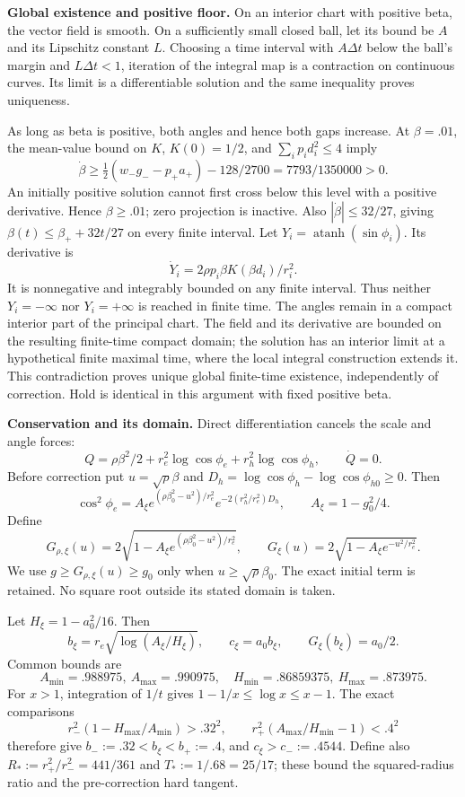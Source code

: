 \documentclass[11pt,a4paper]{article}
\begin{document}
\textbf{Global existence and positive floor.} On an interior chart with positive beta, the vector field is smooth. On a sufficiently small closed ball, let its bound be $A$ and its Lipschitz constant $L$. Choosing a time interval with $A\Delta t$ below the ball's margin and $L\Delta t<1$, iteration of the integral map is a contraction on continuous curves. Its limit is a differentiable solution and the same inequality proves uniqueness.

As long as beta is positive, both angles and hence both gaps increase. At $\beta=.01$, the mean-value bound on $K$, $K(0)=1/2$, and $\sum_i p_i d_i^2\le4$ imply
\[
 \dot\beta\ge\tfrac12(w_-g_--p_+a_+)-128/2700
       =7793/1350000>0 .
\]
An initially positive solution cannot first cross below this level with a positive derivative. Hence $\beta\ge.01$; zero projection is inactive. Also $|\dot\beta|\le32/27$, giving $\beta(t)\le\beta_++32t/27$ on every finite interval. Let $Y_i=\operatorname{atanh}(\sin\phi_i)$. Its derivative is
\[
 \dot Y_i=2\rho p_i\beta K(\beta d_i)/r_i^2 .
\]
It is nonnegative and integrably bounded on any finite interval. Thus neither $Y_i=-\infty$ nor $Y_i=+\infty$ is reached in finite time. The angles remain in a compact interior part of the principal chart. The field and its derivative are bounded on the resulting finite-time compact domain; the solution has an interior limit at a hypothetical finite maximal time, where the local integral construction extends it. This contradiction proves unique global finite-time existence, independently of correction. Hold is identical in this argument with fixed positive beta.

\textbf{Conservation and its domain.} Direct differentiation cancels the scale and angle forces:
\[
 Q=\rho\beta^2/2+r_e^2\log\cos\phi_e+r_h^2\log\cos\phi_h,\qquad \dot Q=0 .
\]
Before correction put $u=\sqrt\rho\beta$ and $D_h=\log\cos\phi_h-\log\cos\phi_{h0}\ge0$. Then
\[
 \cos^2\phi_e=A_\xi e^{(\rho\beta_0^2-u^2)/r_e^2}
                e^{-2(r_h^2/r_e^2)D_h},\qquad A_\xi=1-g_0^2/4.
\]
Define
\[
 G_{\rho,\xi}(u)=2\sqrt{1-A_\xi e^{(\rho\beta_0^2-u^2)/r_e^2}},
 \qquad G_\xi(u)=2\sqrt{1-A_\xi e^{-u^2/r_e^2}}.
\]
We use $g\ge G_{\rho,\xi}(u)\ge g_0$ only when $u\ge\sqrt\rho\beta_0$. The exact initial term is retained. No square root outside its stated domain is taken.

Let $H_\xi=1-a_0^2/16$. Then
\[
 b_\xi=r_e\sqrt{\log(A_\xi/H_\xi)},\qquad c_\xi=a_0b_\xi,
 \qquad G_\xi(b_\xi)=a_0/2.
\]
Common bounds are
\[
 A_{\min}=.988975,\ A_{\max}=.990975,\quad
 H_{\min}=.86859375,\ H_{\max}=.873975.
\]
For $x>1$, integration of $1/t$ gives $1-1/x\le\log x\le x-1$. The exact comparisons
\[
 r_-^2(1-H_{\max}/A_{\min})>.32^2,\qquad
 r_+^2(A_{\max}/H_{\min}-1)<.4^2
\]
therefore give $b_-:=.32<b_\xi<b_+:=.4$, and $c_\xi>c_-:=.4544$. Define also $R_*:=r_+^2/r_-^2=441/361$ and $T_*:=1/.68=25/17$; these bound the squared-radius ratio and the pre-correction hard tangent.
\end{document}
